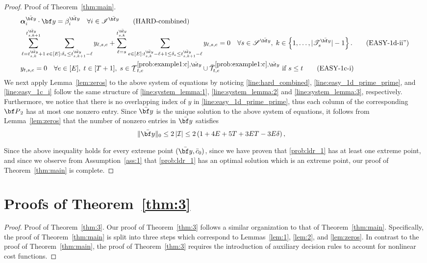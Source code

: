 \documentclass[nonblindrev,mnsc]{informs3} %
\newcommand{\by}{{\bf y}}
\newcommand{\bbp}{{\bf P}}
\newcommand{\balpha}{{\boldsymbol{\alpha}}}
\newcommand{\ubar}[1]{\text{\b{$#1$}}}
\begin{document}
\begin{APPENDICES}
\begin{proof}{Proof of Theorem~\ref{thm:main}. }
\begin{align}
&\balpha_i^{\bar{\by}} \cdot \by = \beta_i^{\bar{\by}} \quad  \forall i \in \mathscr{I}^{\bar{\by}} \tag{HARD-combined} \label{line:hard_combined} \\
&\sum_{\ell=t_{s,k}^{\bar{\by}}+1}^{t_{s,k+1}^{\bar{\by}}} \sum_{e\in [E]: \delta_e\le t_{s,k+1}^{\bar{\by}} -\ell} y_{\ell,s,e}  +  \sum_{\ell=s}^{t_{s,k}^{\bar{\by}}} \sum_{e\in [E]:t_{s,k}^{\bar{\by}} -\ell + 1 \le \delta_e\le t_{s,k+1}^{\bar{\by}} -\ell} y_{\ell,s,e} = 0\quad  \forall s \in \mathscr{S}^{\bar{\by}}, \; k \in \left\{1,\ldots,|\mathscr{T}_s^{\bar{\by}}| - 1 \right \}.  \tag{EASY-1d-ii''} \label{line:easy_1d_prime_prime}\\
&y_{t,s,e} =0 \quad \forall e \in[E], \; t \in[T+1], \; s \in  \ubar{\mathcal{T}}^{\ref{prob:example1:c},\bar{\by}}_{t,e}  \cup \bar{\mathcal{T}}^{\ref{prob:example1:c},\bar{\by}}_{t,e} \text{ if } s \le t \tag{EASY-1c-i} \label{line:easy_1c_i}
 \end{align}
{We next apply Lemma~\ref{lem:zeros} to the above system of equations by noticing \eqref{line:hard_combined}, \eqref{line:easy_1d_prime_prime}, and \eqref{line:easy_1c_i} follow the same structure of \eqref{line:system_lemma:1}, \eqref{line:system_lemma:2} and \eqref{line:system_lemma:3}, respectively. Furthermore, we notice that there is no overlapping index of $y$ in \eqref{line:easy_1d_prime_prime}, thus each column of the corresponding $\bbp_2$ has at most one nonzero entry.}
Since $\bar{\by}$ is the unique solution to the above system of equations, it follows from Lemma~\ref{lem:zeros} that the number of nonzero entries in $\bar{\by}$ satisfies
\begin{align*}
\| \bar{\by} \|_0 \le 2 \left| \mathcal{I} \right| &\le 2 \left( 1 + 4E + 5T + 3ET -3E\delta \right),
\end{align*}

Since the above inequality holds for every extreme point $(\bar{\by},\bar{c}_0)$, since we have proven that \eqref{prob:ldr_1} has at least one extreme point, and since we observe from Assumption~\ref{ass:1} that \eqref{prob:ldr_1} has an optimal solution which is an extreme point, our proof of Theorem~\ref{thm:main} is complete. \halmos 
\end{proof}

\section{Proofs of Theorem~\ref{thm:3}}
\begin{proof}{Proof of Theorem~\ref{thm:3}.}
Our proof of Theorem~\ref{thm:3} follows a similar organization to that of Theorem~\ref{thm:main}. Specifically, the proof of Theorem~\ref{thm:main} is split into three steps which correspond to Lemmas~\ref{lem:1}, \ref{lem:2}, and \ref{lem:zeros}. In contrast to the proof of Theorem~\ref{thm:main}, the proof of Theorem~\ref{thm:3} requires the introduction of auxiliary decision rules to account for nonlinear cost functions. 


\end{proof}
\end{APPENDICES}
\end{document}
